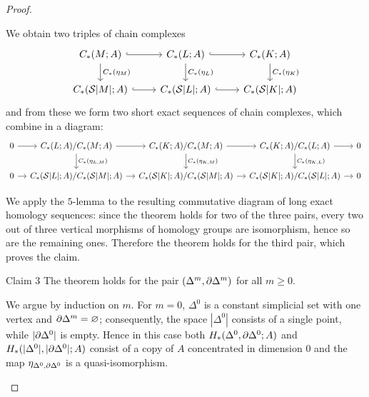 \begin{proof}
\begin{claimproof}
We obtain two triples of chain complexes
\[
\begin{tikzcd}
C_*(M;A) \ar[r,hook] \ar[d,"C_*(\eta_M)"] & C_*(L;A) \ar[r,hook] \ar[d,"C_*(\eta_L)"] & C_*(K;A) \ar[d,"C_*(\eta_K)"]\\
C_*(\S|M|;A) \ar[r,hook] & C_*(\S|L|;A) \ar[r,hook] & C_*(\S|K|;A)
\end{tikzcd}
\]
and from these we form two short exact sequences of chain complexes, which combine in a diagram:
{\small\[
\begin{tikzcd}[column sep=2.5ex]
0 \ar[r] & C_*(L;A)/C_*(M;A) \ar[r] \ar[d,"C_*(\eta_{L,M})"] & C_*(K;A)/C_*(M;A) \ar[r] \ar[d,"C_*(\eta_{K,M})"] & C_*(K;A)/C_*(L;A) \ar[d,"C_*(\eta_{K,L})"] \ar[r] & 0\\
0 \ar[r] & C_*(\S|L|;A)/C_*(\S|M|;A) \ar[r] & C_*(\S|K|;A)/C_*(\S|M|;A) \ar[r] & C_*(\S|K|;A)/C_*(\S|L|;A) \ar[r] & 0
\end{tikzcd}
\]}

We apply the $5$-lemma to the resulting commutative diagram of long exact homology sequences: since the theorem holds for two of the three pairs, every two out of three vertical morphisms of
homology groups are isomorphism, hence so are the remaining ones. Therefore the theorem holds for the
third pair, which proves the claim.
\end{claimproof}

Claim 3 The theorem holds for the pair $(\Delta^m,\partial\Delta^m)$ for all $m\ge0$.

\begin{claimproof}
We argue by induction on $m$. For $m=0$, $\Delta^0$ is a constant simplicial set with one vertex and $\partial\Delta^m=\varnothing$; consequently, the space $|\Delta^0|$ consists of a single point, while $|\partial\Delta^0|$ is empty. Hence in this case both $H_*(\Delta^0,\partial\Delta^0;A)$ and $H_*(|\Delta^0|,|\partial\Delta^0|;A)$ consist of a copy of $A$ concentrated in dimension $0$ and the map $\eta_{\Delta^0,\partial\Delta^0}$ is a quasi-isomorphism.


\end{claimproof}
\end{proof}
